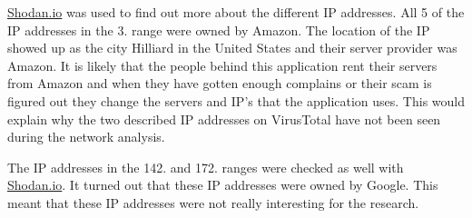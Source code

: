 \href{https://www.shodan.io/host/3.14.182.203}{Shodan.io} was used to find out more about the different IP addresses. All 5 of the IP addresses in the 3. range were owned by Amazon. The location of the IP showed up as the city Hilliard in the United States and their server provider was Amazon. It is likely that the people behind this application rent their servers from Amazon and when they have gotten enough complains or their scam is figured out they change the servers and IP’s that the application uses. This would explain why the two described IP addresses on VirusTotal have not been seen during the network analysis.

The IP addresses in the 142. and 172. ranges were checked as well with \href{https://www.shodan.io/host/172.217.168.234}{Shodan.io}. It turned out that these IP addresses were owned by Google. This meant that these IP addresses were not really interesting for the research.

